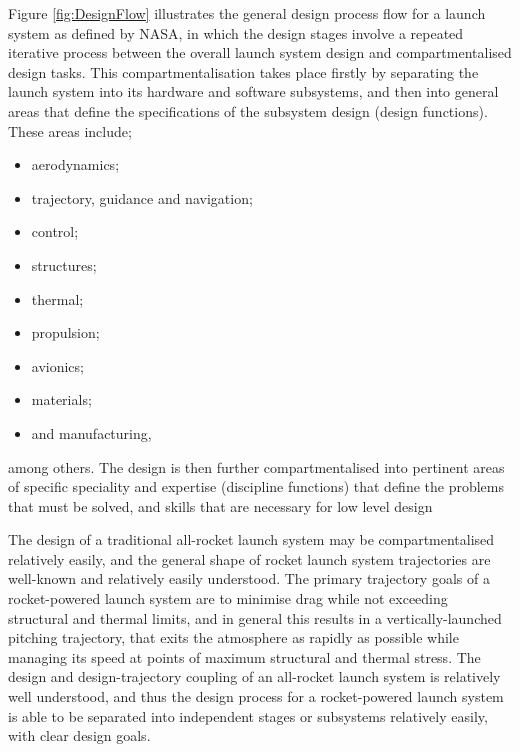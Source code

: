     
     Figure \ref{fig:DesignFlow} illustrates the general design process flow for a launch system as defined by NASA\cite{Blair2001}, in which the design stages involve a repeated iterative process between the overall launch system design and compartmentalised design tasks. This compartmentalisation takes place firstly by separating the
    launch system into its hardware and software subsystems, and then into general areas that define the specifications of the subsystem design (design functions). These areas include;
    \begin{itemize}
    	\setlength\itemsep{.2em}
    	\item aerodynamics;
    	\item trajectory, guidance and navigation;
    	\item control;
    	\item structures;
    	\item thermal;
    	\item propulsion;
    	\item avionics;
    	\item materials;
    	\item and manufacturing,
    \end{itemize}
    among others\cite{Blair2001}. The design is then further compartmentalised into pertinent areas of specific speciality and expertise (discipline functions) that define the problems that must be solved, and skills that are necessary for low level design
    

    The design of a traditional all-rocket launch system may be compartmentalised relatively easily, and the general shape of rocket launch system trajectories are well-known and relatively easily understood.  The primary trajectory goals of a rocket-powered launch system are to minimise drag while not exceeding structural and thermal limits, and in general this results in a vertically-launched pitching trajectory, that exits the atmosphere as rapidly as possible while managing its speed at points of maximum structural and thermal stress. The design and design-trajectory coupling of an all-rocket launch system is relatively well understood, and thus the design process for a rocket-powered launch system is able to be separated into independent stages or subsystems relatively easily, with clear design goals. 
    
   
    

